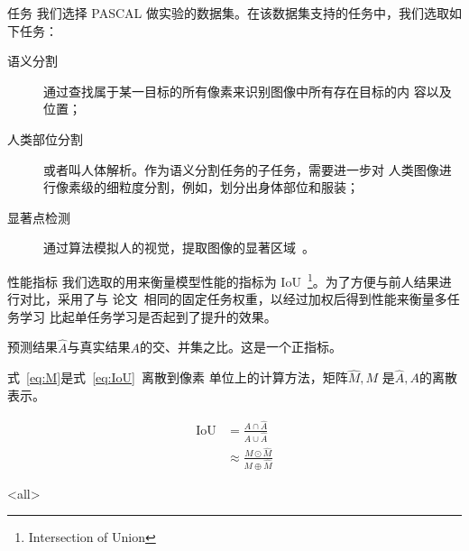 \documentclass[../main]{subfiles}
\begin{document}
\begin{frame}{任务}
  我们选择 PASCAL 做实验的数据集。在该数据集支持的任务中，我们选取如下任务：

  \begin{description}
    \item[语义分割]通过查找属于某一目标的所有像素来识别图像中所有存在目标的内
      容以及位置；
    \item[人类部位分割]或者叫人体解析。作为语义分割任务的子任务，需要进一步对
      人类图像进行像素级的细粒度分割，例如，划分出身体部位和服装；
    \item[显著点检测]通过算法模拟人的视觉，提取图像的显著区域~\cite{730558}。
  \end{description}
\end{frame}

\begin{frame}{性能指标}
  我们选取的用来衡量模型性能的指标为
  IoU~\footnote{Intersection of Union}。为了方便与前人结果进行对比，采用了与
  论文~\cite{9336293}相同的固定任务权重，以经过加权后得到性能来衡量多任务学习
  比起单任务学习是否起到了提升的效果。

  \begin{definition}[IoU]
    预测结果$\hat{A}$与真实结果$A$的交、并集之比。这是一个正指标。

    式~\ref{eq:M}是式~\ref{eq:IoU}~离散到像素
    单位上的计算方法，矩阵$\hat{M}, M$ 是$\hat{A}, A$的离散表示。  \end{definition}

  \begin{align}
    \label{eq:IoU}
    \mathrm{IoU} & = \frac{A \cap \hat{A}}{A \cup \hat{A}} \\
    \label{eq:M}
                 & \approx \frac{M \odot \hat{M}}{M \oplus \hat{M}}
  \end{align}
\end{frame}

\mode<all>
\end{document}
